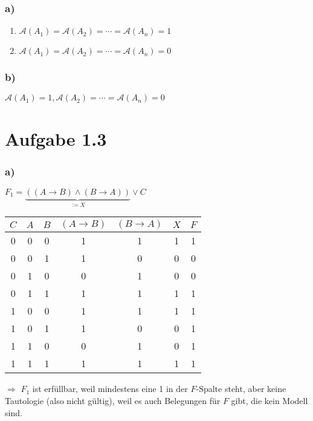\documentclass[a4paper,12pt]{article}
\begin{document}
	\subsubsection*{a)}
	\begin{enumerate}
		\item $\mathcal{A} \left( A_1\right) = \mathcal{A} \left( A_2\right) = \cdots = \mathcal{A} \left( A_n\right) = 1$
		\item $\mathcal{A} \left( A_1\right) = \mathcal{A} \left( A_2\right) = \cdots = \mathcal{A} \left( A_n\right) = 0$
	\end{enumerate}
	\subsubsection*{b)}
	\hspace{0.3cm} $\mathcal{A} \left( A_1\right) = 1, \mathcal{A} \left( A_2\right) = \cdots = \mathcal{A} \left( A_n\right) = 0$
	\newpage

	\section*{Aufgabe 1.3}
	\subsubsection*{a)}
	\begin{center}
		$F_1 = \underbrace{\left( \left( A \rightarrow B\right) \wedge \left( B \rightarrow A \right) \right)}_{:= X} \vee C$
	\end{center}
	\begin{table}[H]
		\centering
		\begin{tabular}{c|c|c|c|c|c|c}
			$C$ & $A$ & $B$ & $\left( A \rightarrow B\right)$ & $\left( B \rightarrow A\right)$ & $X$ & $F$\\ \hline
			0 & 0 & 0 & 1 & 1 & 1 & 1 \\
			0 & 0 & 1 & 1 & 0 & 0 & 0 \\
			0 & 1 & 0 & 0 & 1 & 0 & 0 \\
			0 & 1 & 1 & 1 & 1 & 1 & 1 \\
			1 & 0 & 0 & 1 & 1 & 1 & 1 \\
			1 & 0 & 1 & 1 & 0 & 0 & 1 \\
			1 & 1 & 0 & 0 & 1 & 0 & 1 \\
			1 & 1 & 1 & 1 & 1 & 1 & 1
		\end{tabular}
	\end{table}
	\begin{center}
		$\Rightarrow$ $F_1$ ist erfüllbar, weil mindestens eine 1 in der $F$-Spalte steht, aber keine Tautologie (also nicht gültig), weil es auch Belegungen für $F$ gibt, die kein Modell sind.
	\end{center}
\end{document}
